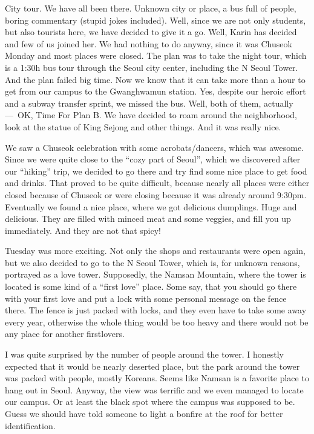 \begin{post}
	\begin{content}
City tour. We have all been there. Unknown city or place, a bus full of people, boring commentary (stupid jokes included). Well, since we are not only students, but also tourists here, we have decided to give it a go. Well, Karin has decided and few of us joined her. We had nothing to do anyway, since it was Chuseok Monday and most places were closed. The plan was to take the night tour, which is a 1:30h bus tour through the Seoul city center, including the N Seoul Tower. And the plan failed big time. Now we know that it can take more than a hour to get from our campus to the Gwanghwamun station. Yes, despite our heroic effort and a subway transfer sprint, we missed the bus. Well, both of them, actually — OK, Time For Plan B. We have decided to roam around the neighborhood, look at the statue of King Sejong and other things. And it was really nice.

We saw a Chuseok celebration with some acrobats/dancers, which was awesome. Since we were quite close to the ``cozy part of Seoul'', which we discovered after our ``hiking'' trip, we decided to go there and try find some nice place to get food and drinks. That proved to be quite difficult, because nearly all places were either closed because of Chuseok or were closing because it was already around 9:30pm. Eventually we found a nice place, where we got delicious dumplings. Huge and delicious. They are filled with minced meat and some veggies, and fill you up immediately. And they are not that spicy!

Tuesday was more exciting. Not only the shops and restaurants were open again, but we also decided to go to the N Seoul Tower, which is, for unknown reasons, portrayed as a love tower. Supposedly, the Namsan Mountain, where the tower is located is some kind of a ``first love'' place. Some say, that you should go there with your first love and put a lock with some personal message on the fence there. The fence is just packed with locks, and they even have to take some away every year, otherwise the whole thing would be too heavy and there would not be any place for another firstlovers.

I was quite surprised by the number of people around the tower. I honestly expected that it would be nearly deserted place, but the park around the tower was packed with people, mostly Koreans. Seems like Namsan is a favorite place to hang out in Seoul. Anyway, the view was terrific and we even managed to locate our campus. Or at least the black spot where the campus was supposed to be. Guess we should have told someone to light a bonfire at the roof for better identification.


\end{content}
\end{post}
